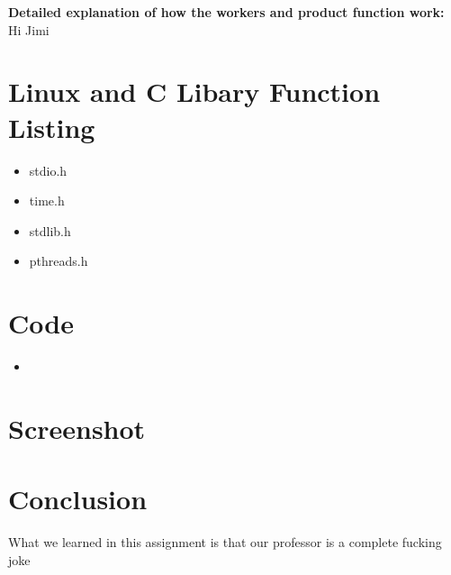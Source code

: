 \documentclass{article}
\newcommand{\insertcode}[2]{
\begin{itemize}
\item[]
\end{itemize}
}
\begin{document}
\textbf{\Large{Detailed explanation of how the workers and product function work:}}\\

Hi Jimi
\clearpage


\section{Linux and C Libary Function Listing}
\begin{itemize}
    \item stdio.h
    \item time.h
    \item stdlib.h
    \item pthreads.h
\end{itemize}
\clearpage



\section{Code}
\insertcode{main}{Matrix Multiplication of nxn matrices using p\_threads}
\clearpage


\section{Screenshot}
\begin{center}
\end{center}
\clearpage



\section{Conclusion}
What we learned in this assignment is that our professor is a complete fucking joke
\end{document}
